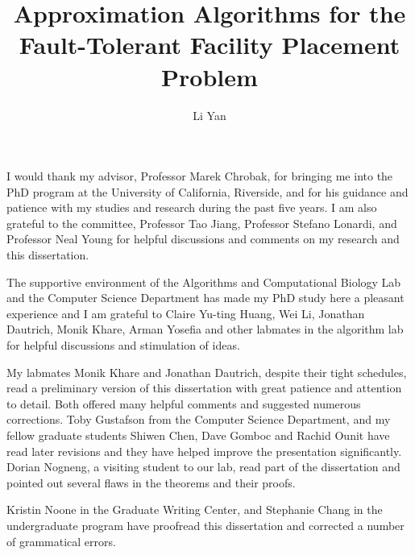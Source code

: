 \documentclass[oneside,final]{ucr}
\begin{document}

\title{Approximation Algorithms for the Fault-Tolerant Facility Placement Problem}
\author{Li Yan}

\maketitle
\copyrightpage{}
\approvalpage{}


\begin{frontmatter}

\begin{acknowledgements}
  I would thank my advisor, Professor Marek Chrobak, for
  bringing me into the PhD program at the University of
  California, Riverside, and for his guidance and patience
  with my studies and research during the past five years. I
  am also grateful to the committee, Professor Tao Jiang,
  Professor Stefano Lonardi, and Professor Neal Young for
  helpful discussions and comments on my research and this
  dissertation.

  The supportive environment of the Algorithms and
  Computational Biology Lab and the Computer Science
  Department has made my PhD study here a pleasant
  experience and I am grateful to Claire Yu-ting Huang, Wei
  Li, Jonathan Dautrich, Monik Khare, Arman Yosefia and
  other labmates in the algorithm lab for helpful
  discussions and stimulation of ideas.

  My labmates Monik Khare and Jonathan Dautrich, despite
  their tight schedules, read a preliminary version of this
  dissertation with great patience and attention to
  detail. Both offered many helpful comments and suggested
  numerous corrections. Toby Gustafson from the Computer
  Science Department, and my fellow graduate students Shiwen
  Chen, Dave Gomboc and Rachid Ounit have read later
  revisions and they have helped improve the presentation
  significantly. Dorian Nogneng, a visiting student to our
  lab, read part of the dissertation and pointed out several
  flaws in the theorems and their proofs.

  Kristin Noone in the Graduate Writing Center, and
  Stephanie Chang in the undergraduate program have
  proofread this dissertation and corrected a number of
  grammatical errors.


\end{acknowledgements}
\end{frontmatter}
\end{document}
